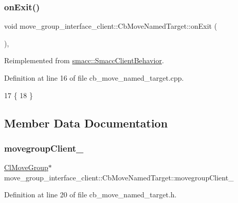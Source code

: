 \subsubsection{\texorpdfstring{on\+Exit()}{onExit()}}
{\footnotesize\ttfamily void move\+\_\+group\+\_\+interface\+\_\+client\+::\+Cb\+Move\+Named\+Target\+::on\+Exit (\begin{DoxyParamCaption}{ }\end{DoxyParamCaption})\hspace{0.3cm}{\ttfamily [override]}, {\ttfamily [virtual]}}



Reimplemented from \hyperlink{classsmacc_1_1SmaccClientBehavior_ac0cd72d42bd00425362a97c9803ecce5}{smacc\+::\+Smacc\+Client\+Behavior}.



Definition at line 16 of file cb\+\_\+move\+\_\+named\+\_\+target.\+cpp.


\begin{DoxyCode}
17 \{
18 \}
\end{DoxyCode}


\subsection{Member Data Documentation}
\mbox{\label{classmove__group__interface__client_1_1CbMoveNamedTarget_acd7b16a1c38b103c0624fad1dfd99176}} 
\subsubsection{\texorpdfstring{movegroup\+Client\+\_\+}{movegroupClient\_}}
{\footnotesize\ttfamily \hyperlink{classmove__group__interface__client_1_1ClMoveGroup}{Cl\+Move\+Group}$\ast$ move\+\_\+group\+\_\+interface\+\_\+client\+::\+Cb\+Move\+Named\+Target\+::movegroup\+Client\+\_\+\hspace{0.3cm}{\ttfamily [protected]}}



Definition at line 20 of file cb\+\_\+move\+\_\+named\+\_\+target.\+h.



